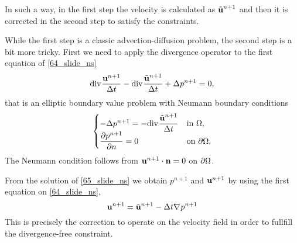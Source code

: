 In such a way, in the first step the velocity is calculated as \(\tilde{\textbf{u}}^{n+1}\) and then it is corrected in the second step to satisfy the constraints.

While the first step is a classic advection-diffusion problem, the second step is a bit more tricky. First we need to apply the divergence operator to the first equation of \eqref{64_slide_ns}
\[
    \text{div}\mspace{1mu}\frac{\textbf{u}^{n+1}}{\Delta t} -\text{div}\mspace{1mu} \frac{\tilde{\textbf{u}}^{n+1}}{\Delta t} + \Delta p^{n+1} = 0,
\]
that is an elliptic boundary value problem with Neumann boundary conditions 
\begin{equation}
    \begin{cases}
        -\Delta p^{n+1} = -\div \dfrac{\tilde{\uvec}^{n+1}}{\tstep} & \txt{in }\Omega, \\
        \displaystyle\partialderivative{p^{n+1}}{n} = 0 & \txt{on }\boundary.
    \end{cases}
    \label{65_slide_ns}
\end{equation}
The Neumann condition follows from \(\textbf{u}^{n+1}\cdot \textbf{n} = 0\) on \({\partial\Omega}\).

From the solution of \eqref{65_slide_ns} we obtain \(p^{n+1}\) and \(\textbf{u}^{n+1}\) by using the first equation on \eqref{64_slide_ns}, 
\begin{equation}
    \textbf{u}^{n+1} = \tilde{\textbf{u}}^{n+1} - \Delta t \nabla\mspace{1mu} p^{n+1}
    \label{66_slide_ns}
\end{equation}
This is precisely the correction to operate on the velocity field in order to fullfill the divergence-free constraint. 

